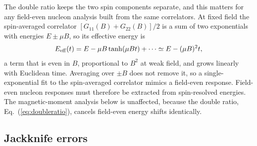 \documentclass[aps,prd,preprint,nofootinbib,floatfix]{revtex4-2}
\begin{document}
The double ratio keeps the two spin components separate, and this matters for any field-even nucleon analysis built from the same correlators. At fixed field the spin-averaged correlator $[G_{11}(B)+G_{22}(B)]/2$ is a sum of two exponentials with energies $E\pm\mu B$, so its effective energy is
\begin{equation}
E_{\rm eff}(t)=E-\mu B\tanh(\mu B t)+\cdots\simeq E-(\mu B)^2 t,
\label{eq:spinavg}
\end{equation}
a term that is even in $B$, proportional to $B^2$ at weak field, and grows linearly with Euclidean time. Averaging over $\pm B$ does not remove it, so a single-exponential fit to the spin-averaged correlator mimics a field-even response. Field-even nucleon responses must therefore be extracted from spin-resolved energies. The magnetic-moment analysis below is unaffected, because the double ratio, Eq.~(\ref{eq:doubleratio}), cancels field-even energy shifts identically.

\subsection{Jackknife errors}
\end{document}
